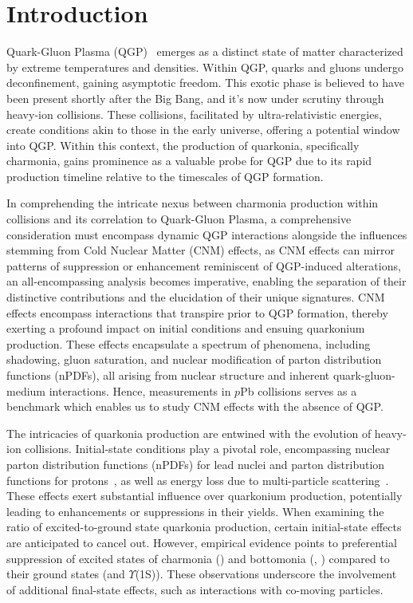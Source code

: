 \section{Introduction}
\label{sec:Introduction}
Quark-Gluon Plasma (QGP)~\cite{Satz_2011} emerges as a distinct state of matter characterized by extreme temperatures and densities. Within QGP, quarks and gluons undergo deconfinement, gaining asymptotic freedom. This exotic phase is believed to have been present shortly after the Big Bang, and it's now under scrutiny through heavy-ion collisions. These collisions, facilitated by ultra-relativistic energies, create conditions akin to those in the early universe, offering a potential window into QGP. Within this context, the production of quarkonia, specifically charmonia, gains prominence as a valuable probe for QGP due to its rapid production timeline relative to the timescales of QGP formation.

In comprehending the intricate nexus between charmonia production within collisions and its correlation to Quark-Gluon Plasma, a comprehensive consideration must encompass dynamic QGP interactions alongside the influences stemming from Cold Nuclear Matter (CNM) effects, as CNM effects can mirror patterns of suppression or enhancement reminiscent of QGP-induced alterations, an all-encompassing analysis becomes imperative, enabling the separation of their distinctive contributions and the elucidation of their unique signatures. CNM effects encompass interactions that transpire prior to QGP formation, thereby exerting a profound impact on initial conditions and ensuing quarkonium production. These effects encapsulate a spectrum of phenomena, including shadowing, gluon saturation, and nuclear modification of parton distribution functions (nPDFs), all arising from nuclear structure and inherent quark-gluon-medium interactions. Hence, measurements in $p$Pb collisions serves as a benchmark which enables us to study CNM effects with the absence of QGP.

The intricacies of quarkonia production are entwined with the evolution of heavy-ion collisions. Initial-state conditions play a pivotal role, encompassing nuclear parton distribution functions (nPDFs) for lead nuclei and parton distribution functions for protons~\cite{AtashbarTehrani:2017mzi}, as well as energy loss due to multi-particle scattering~\cite{Arleo:2014oha}. These effects exert substantial influence over quarkonium production, potentially leading to enhancements or suppressions in their yields. When examining the ratio of excited-to-ground state quarkonia production, certain initial-state effects are anticipated to cancel out. However, empirical evidence points to preferential suppression of excited states of charmonia (\psitwos) and bottomonia (\TwoS, \ThreeS) compared to their ground states (\jpsi and $\Upsilon$(1S))\cite{LHCb:2018psc,ALICE:2020vjy, LHCb:2016vqr}. These observations underscore the involvement of additional final-state effects, such as interactions with co-moving particles\cite{Ferreiro:2012rq}.

